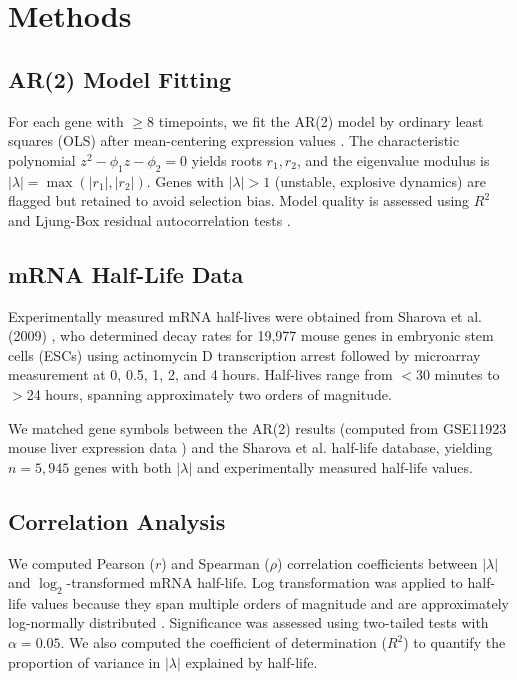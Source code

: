 \documentclass[11pt,letterpaper]{article}
\begin{document}
\section{Methods}

\subsection{AR(2) Model Fitting}

For each gene with $\geq 8$ timepoints, we fit the AR(2) model by ordinary least squares (OLS) after mean-centering expression values \citep{hamilton1994time, box2015time}. The characteristic polynomial $z^2 - \phi_1 z - \phi_2 = 0$ yields roots $r_1, r_2$, and the eigenvalue modulus is $|\lambda| = \max(|r_1|, |r_2|)$. Genes with $|\lambda| > 1$ (unstable, explosive dynamics) are flagged but retained to avoid selection bias. Model quality is assessed using $R^2$ and Ljung-Box residual autocorrelation tests \citep{ljung1978measure}.

\subsection{mRNA Half-Life Data}

Experimentally measured mRNA half-lives were obtained from Sharova et al. (2009) \citep{sharova2009database}, who determined decay rates for 19,977 mouse genes in embryonic stem cells (ESCs) using actinomycin D transcription arrest followed by microarray measurement at 0, 0.5, 1, 2, and 4 hours. Half-lives range from $<$30 minutes to $>$24 hours, spanning approximately two orders of magnitude.

We matched gene symbols between the AR(2) results (computed from GSE11923 mouse liver expression data \citep{zhang2014circadian}) and the Sharova et al. half-life database, yielding $n = 5{,}945$ genes with both $|\lambda|$ and experimentally measured half-life values.

\subsection{Correlation Analysis}

We computed Pearson ($r$) and Spearman ($\rho$) correlation coefficients between $|\lambda|$ and $\log_2$-transformed mRNA half-life. Log transformation was applied to half-life values because they span multiple orders of magnitude and are approximately log-normally distributed \citep{sharova2009database}. Significance was assessed using two-tailed tests with $\alpha = 0.05$. We also computed the coefficient of determination ($R^2$) to quantify the proportion of variance in $|\lambda|$ explained by half-life.
\end{document}
